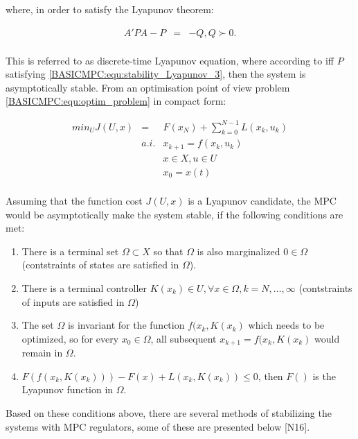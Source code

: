 		where, in order to satisfy the Lyapunov theorem:
		
		\begin{equation}
        \begin{array}{rcl}
				A'PA-P&=&-Q, Q\succ 0.\\
        \end{array}
        \label{BASICMPC:equ:stability_Lyapunov_3}
    \end{equation}
		
	This is referred to as discrete-time Lyapunov equation, where  according to \cite{borrelli2017predictive} iff $P$ satisfying \ref{BASICMPC:equ:stability_Lyapunov_3}, then the system is asymptotically stable. From an optimisation point of view problem \ref{BASICMPC:equ:optim_problem} in compact form:
	
\begin{equation}
        \begin{array}{rcl}
				min_UJ(U,x)&=&F(x_N)+\sum^{N-1}_{k=0}L(x_k,u_k) \\
					&a.i.&x_{k+1}=f(x_k,u_k) \\
					&&x\in X, u\in U\\
					&&x_0=x(t)\\
        \end{array}
        \label{BASICMPC:equ:optim_stability}
    \end{equation}

Assuming that the function cost $J(U,x)$ is a Lyapunov candidate, the MPC would be asymptotically make the system stable, if the following conditions are met:
\begin{enumerate}
	\item There is a terminal set $\Omega\subset X$ so that $\Omega$ is also marginalized $0\in\Omega$ (contstraints of states are satisfied in $\Omega$).
	\item There is a terminal controller $K(x_k)\in U, \forall x\in\Omega,k=N,\dots,\infty$ (contstraints of inputs are satisfied in $\Omega$)
	\item The set $\Omega$ is invariant for the function $f(x_k,K(x_k)$ which needs to be optimized, so for every $x_0\in\Omega$, all subsequent $x_{k+1}=f(x_k,K(x_k)$ would remain in $\Omega$.
	\item $F(f(x_k,K(x_k)))-F(x)+L(x_k,K(x_k))\leq 0$, then $F()$ is the Lyapunov function in $\Omega$.
\end{enumerate}

Based on these conditions above, there are several methods of stabilizing the systems with MPC regulators, some of these are presented below [N16].

